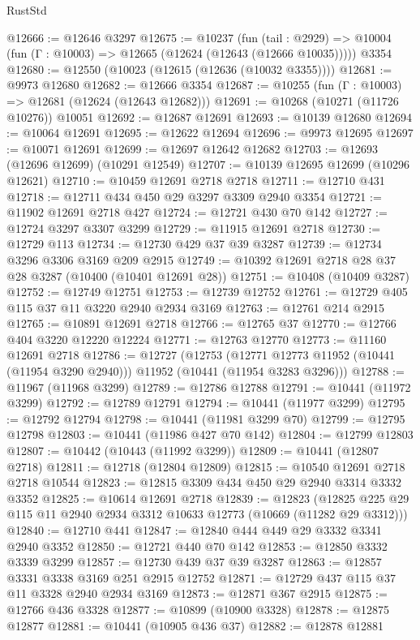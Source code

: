 \begin{lexlean}{RustStd}
\begin{coremodule}
@12666 := @12646 @3297
@12675 := @10237
    (fun (tail : @2929) => @10004 (fun (Γ : @10003) => @12665 (@12624 (@12643 (@12666 @10035)))))
    @3354
@12680 := @12550 (@10023 (@12615 (@12636 (@10032 @3355))))
@12681 := @9973 @12680
@12682 := @12666 @3354
@12687 := @10255 (fun (Γ : @10003) => @12681 (@12624 (@12643 @12682)))
@12691 := @10268 (@10271 (@11726 @10276)) @10051
@12692 := @12687 @12691
@12693 := @10139 @12680
@12694 := @10064 @12691
@12695 := @12622 @12694
@12696 := @9973 @12695
@12697 := @10071 @12691
@12699 := @12697 @12642 @12682
@12703 := @12693 (@12696 @12699) (@10291 @12549)
@12707 := @10139 @12695 @12699 (@10296 @12621)
@12710 := @10459 @12691 @2718 @2718
@12711 := @12710 @431
@12718 := @12711 @434 @450 @29 @3297 @3309 @2940 @3354
@12721 := @11902 @12691 @2718 @427
@12724 := @12721 @430 @70 @142
@12727 := @12724 @3297 @3307 @3299
@12729 := @11915 @12691 @2718
@12730 := @12729 @113
@12734 := @12730 @429 @37 @39 @3287
@12739 := @12734 @3296 @3306 @3169 @209 @2915
@12749 := @10392 @12691 @2718 @28 @37 @28 @3287 (@10400 (@10401 @12691 @28))
@12751 := @10408 (@10409 @3287)
@12752 := @12749 @12751
@12753 := @12739 @12752
@12761 := @12729 @405 @115 @37 @11 @3220 @2940 @2934 @3169
@12763 := @12761 @214 @2915
@12765 := @10891 @12691 @2718
@12766 := @12765 @37
@12770 := @12766 @404 @3220 @12220 @12224
@12771 := @12763 @12770
@12773 := @11160 @12691 @2718
@12786 := @12727
    (@12753
      (@12771 @12773 @11952 (@10441 (@11954 @3290 @2940)))
      @11952
      (@10441 (@11954 @3283 @3296)))
@12788 := @11967 (@11968 @3299)
@12789 := @12786 @12788
@12791 := @10441 (@11972 @3299)
@12792 := @12789 @12791
@12794 := @10441 (@11977 @3299)
@12795 := @12792 @12794
@12798 := @10441 (@11981 @3299 @70)
@12799 := @12795 @12798
@12803 := @10441 (@11986 @427 @70 @142)
@12804 := @12799 @12803
@12807 := @10442 (@10443 (@11992 @3299))
@12809 := @10441 (@12807 @2718)
@12811 := @12718 (@12804 @12809)
@12815 := @10540 @12691 @2718 @2718 @10544
@12823 := @12815 @3309 @434 @450 @29 @2940 @3314 @3332 @3352
@12825 := @10614 @12691 @2718
@12839 := @12823
    (@12825 @225 @29 @115 @11 @2940 @2934 @3312 @10633 @12773 (@10669 (@11282 @29 @3312)))
@12840 := @12710 @441
@12847 := @12840 @444 @449 @29 @3332 @3341 @2940 @3352
@12850 := @12721 @440 @70 @142
@12853 := @12850 @3332 @3339 @3299
@12857 := @12730 @439 @37 @39 @3287
@12863 := @12857 @3331 @3338 @3169 @251 @2915 @12752
@12871 := @12729 @437 @115 @37 @11 @3328 @2940 @2934 @3169
@12873 := @12871 @367 @2915
@12875 := @12766 @436 @3328
@12877 := @10899 (@10900 @3328)
@12878 := @12875 @12877
@12881 := @10441 (@10905 @436 @37)
@12882 := @12878 @12881

\end{coremodule}
\end{lexlean}
